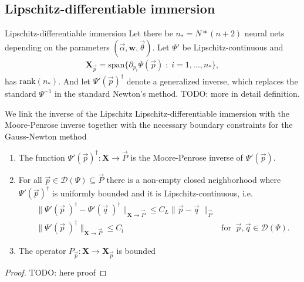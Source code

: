 \subsection{Lipschitz-differentiable immersion}
\begin{mydef}{Lipschitz-differentiable immersion}
    Let there be $n_* = N*(n+2)$ neural nets depending on the parameters
    $(\vec{\alpha}, \mathbf{w}, \vec{\theta})$. Let $\Psi'$ be
    Lipschitz-continuous and
    \begin{align}
        \mathbf{X}_{\vec{p}} =
        \text{span}\{\partial_{p_i}\Psi(\vec{p})\;:\;i=1,\ldots,n_*\},
        \label{eq: lpdi-property}
    \end{align}
    has $\text{rank}(n_*)$.
    And let $\Psi'(\vec{p})^{\dagger}$ denote a generalized inverse,
    which replaces the standard $\Psi^{-1}$ in the standard Newton's method.
    TODO: more in detail definition.
\end{mydef}
We link the inverse of the Lipschitz Lipschitz-differentiable immersion with
the Moore-Penrose inverse together with the necessary boundary constraints
for the Gauss-Newton method
\begin{theorem}
    \begin{enumerate}
        \item The function $\Psi'(\vec{p})^{\dagger}: \mathbf{X} \to \vec{P}$
            is the Moore-Penrose inverse of $\Psi'(\vec{p})$.
        \item For all $\vec{p} \in \mathcal{D}(\Psi) \subseteq \vec{P}$
            there is a non-empty closed neighborhood where
            $\Psi'(\vec{p})^{\dagger}$ is uniformly bounded and it is
            Lipschitz-continuous, i.e.
            \begin{align}
                &\|\Psi'(\vec{p}\;)^{\dagger} -
                \Psi'(\vec{q}\;)^{\dagger}\|_{\mathbf{X}\to\vec{P}}
                \leq C_L \|\vec{p} - \vec{q}\;\|_{\vec{P}}&\\
                &\|\Psi'(\vec{p}\;)^{\dagger}
                \|_{\mathbf{X}\to\vec{P}} \leq C_l\qquad &\text{for}\;\;
                \vec{p}, \vec{q}\in \mathcal{D}(\Psi).
            \end{align}
    \item The operator $P_{\vec{p}}: \mathbf{X} \to \mathbf{X}_{\vec{p}}$ is
            bounded
    \end{enumerate}
\end{theorem}
\begin{proof}
    TODO: here proof
\end{proof}

